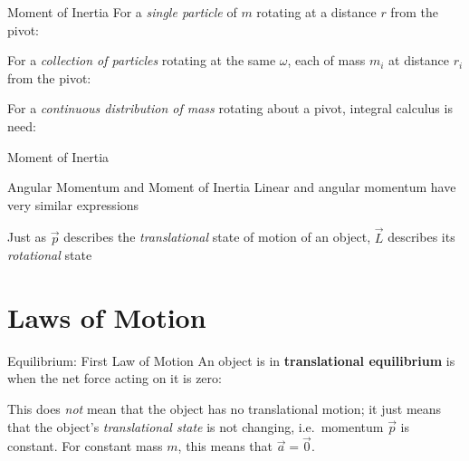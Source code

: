 \documentclass[12pt,compress,aspectratio=169]{beamer}
\begin{document}
\begin{frame}{Moment of Inertia}
  For a \emph{single particle} of $m$ rotating at a distance $r$ from the pivot:
  

  For a \emph{collection of particles} rotating at the same $\omega$, each of
  mass $m_i$ at distance $r_i$ from the pivot:


  For a \emph{continuous distribution of mass} rotating about a pivot, integral
  calculus is need:

\end{frame}



\begin{frame}{Moment of Inertia}
  \centering
\end{frame}



\begin{frame}{Angular Momentum and Moment of Inertia}
  Linear and angular momentum have very similar expressions
    
  \vspace{-.3in}{\large
    \begin{align*}
      \vec p &= m\vec v\\
      \vec L &= I\vec\omega
    \end{align*}
  }
  
  Just as $\vec p$ describes the \emph{translational} state of motion of an
  object, $\vec L$ describes its \emph{rotational} state
\end{frame}



\section{Laws of Motion}

\begin{frame}{Equilibrium: First Law of Motion}
  An object is in \textbf{translational equilibrium} is when the net force
  acting on it is zero:
  

  This does \emph{not} mean that the object has no translational motion; it
  just means that the object's \emph{translational state} is not changing,
  i.e.\ momentum $\vec p$ is constant. For constant mass $m$, this means that
  $\vec a=\vec 0$.
\end{frame}
\end{document}
